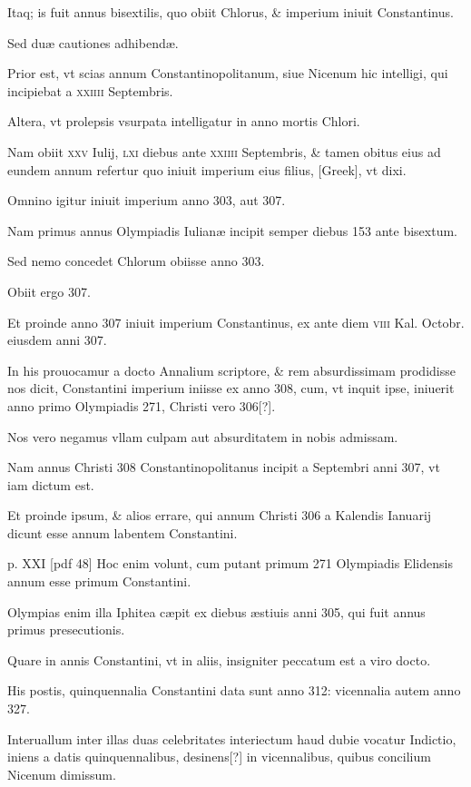 \begin{parnumbers}
Itaq; is fuit annus bisextilis,
quo obiit Chlorus, \& imperium iniuit Constantinus.

Sed duæ
cautiones adhibendæ.

Prior est, vt scias annum Constantinopolitanum,
siue Nicenum hic intelligi, qui incipiebat a \textsc{xxiiii} Septembris.

Altera, vt prolepsis vsurpata intelligatur in anno mortis Chlori.

Nam obiit \textsc{xxv} Iulij, \textsc{lxi} diebus ante
\textsc{xxiiii} Septembris, \&
tamen obitus eius ad eundem annum refertur quo iniuit imperium
eius filius, \textgreek{[Greek]}, vt dixi.

Omnino igitur iniuit imperium anno
303, aut 307.

Nam primus annus Olympiadis Iulianæ incipit semper
diebus 153 ante bisextum.

Sed nemo concedet Chlorum obiisse
anno 303.

Obiit ergo 307.

Et proinde anno 307 iniuit imperium
Constantinus, ex ante diem \textsc{viii} Kal. Octobr. eiusdem anni 307.

In his prouocamur a docto Annalium scriptore, \& rem absurdissimam
prodidisse nos dicit, Constantini imperium iniisse ex anno
308, cum, vt inquit ipse, iniuerit anno primo Olympiadis 271,
Christi vero 306[?].

Nos vero negamus vllam culpam aut absurditatem
in nobis admissam.

Nam annus Christi 308 Constantinopolitanus
incipit a Septembri anni 307, vt iam dictum est.

Et proinde ipsum, \& alios errare, qui annum Christi 306 a Kalendis Ianuarij
dicunt esse annum labentem Constantini.

\clearpage
p. XXI [pdf 48]
Hoc enim volunt,
cum putant primum 271 Olympiadis Elidensis annum esse primum
Constantini.

Olympias enim illa Iphitea cæpit ex diebus æstiuis
anni 305, qui fuit annus primus presecutionis.

Quare in annis
Constantini, vt in aliis, insigniter peccatum est a viro docto.

His
postis, quinquennalia Constantini data sunt anno 312: vicennalia
autem anno 327.

Interuallum inter illas duas celebritates interiectum
haud dubie vocatur Indictio, iniens a datis quinquennalibus,
desinens[?] in vicennalibus, quibus concilium Nicenum dimissum.


\end{parnumbers}

